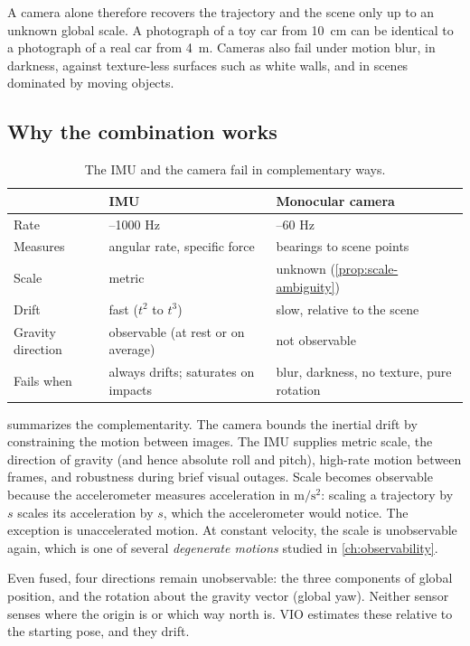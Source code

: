 A camera alone therefore recovers the trajectory and the scene only up to an unknown global scale.
A photograph of a toy car from 10~cm can be identical to a photograph of a real car from 4~m. Cameras
also fail under motion blur, in darkness, against texture-less surfaces such as white walls, and in
scenes dominated by moving objects.

\subsection{Why the combination works}

\begin{table}[t]
\centering\small
\begin{tabularx}{\textwidth}{@{}>{\raggedright\arraybackslash}X >{\raggedright\arraybackslash}X >{\raggedright\arraybackslash}X@{}}
\toprule
 & \textbf{IMU} & \textbf{Monocular camera} \\
\midrule
Rate & 100--1000 Hz & 10--60 Hz \\
Measures & angular rate, specific force & bearings to scene points \\
Scale & metric & unknown (\cref{prop:scale-ambiguity}) \\
Drift & fast ($t^2$ to $t^3$) & slow, relative to the scene \\
Gravity direction & observable (at rest or on average) & not observable \\
Fails when & always drifts; saturates on impacts & blur, darkness, no texture, pure rotation \\
\bottomrule
\end{tabularx}
\caption{The IMU and the camera fail in complementary ways.}
\label{tab:sensor-complement}
\end{table}

 summarizes the complementarity. The camera bounds the inertial drift by
constraining the motion between images. The IMU supplies metric scale, the direction of gravity
(and hence absolute roll and pitch), high-rate motion between frames, and robustness during brief
visual outages. Scale becomes observable because the accelerometer measures acceleration in
$\mathrm{m/s^2}$: scaling a trajectory by $s$ scales its acceleration by $s$, which the
accelerometer would notice. The exception is unaccelerated motion. At constant velocity, the
scale is unobservable again, which is one of several \emph{degenerate motions} studied in
\cref{ch:observability}.

Even fused, four directions remain unobservable: the three components of global position, and the
rotation about the gravity vector (global yaw). Neither sensor senses where the origin is or which
way north is. VIO estimates these relative to the starting pose, and they drift.

